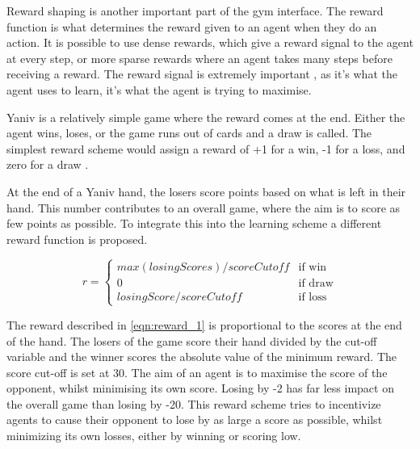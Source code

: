 \documentclass[../main.tex]{subfiles}
\begin{document}
Reward shaping is another important part of the gym interface. The reward function is what determines the reward given to an agent when they do an action. It is possible to use dense rewards, which give a reward signal to the agent at every step, or more sparse rewards where an agent takes many steps before receiving a reward. The reward signal is extremely important \cite{li_deep_2018}, as it's what the agent uses to learn, it's what the agent is trying to maximise. 

Yaniv is a relatively simple game where the reward comes at the end. Either the agent wins, loses, or the game runs out of cards and a draw is called. The simplest reward scheme would assign a reward of +1 for a win, -1 for a loss, and zero for a draw \cite{warchalski_deep_2020}.

At the end of a Yaniv hand, the losers score points based on what is left in their hand. This number contributes to an overall game, where the aim is to score as few points as possible. To integrate this into the learning scheme a different reward function is proposed. 

\begin{equation}
r = \begin{cases}
    max(losingScores) / scoreCutoff & \text{if win} \\
                                   0 & \text{if draw} \\
    losingScore / scoreCutoff   & \text{if loss}
    \end{cases}
\label{eqn:reward_1}
\end{equation}

The reward described in \eqref{eqn:reward_1} is proportional to the scores at the end of the hand. The losers of the game score their hand divided by the cut-off variable and the winner scores the absolute value of the minimum reward. The score cut-off is set at 30. The aim of an agent is to maximise the score of the opponent, whilst minimising its own score. Losing by -2 has far less impact on the overall game than losing by -20. This reward scheme tries to incentivize agents to cause their opponent to lose by as large a score as possible, whilst minimizing its own losses, either by winning or scoring low.
\end{document}

